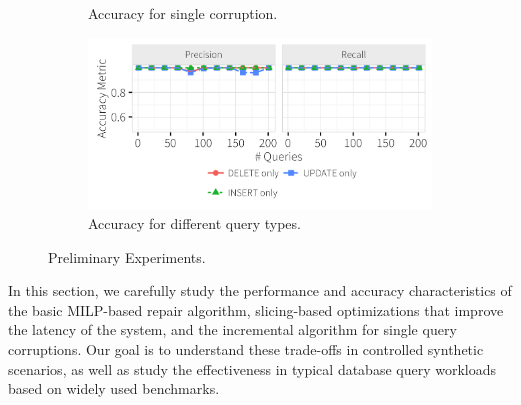 \begin{figure}[h]
\begin{subfigure}[t]{.3\textwidth}
    \vspace*{-.25in}
    \caption{Accuracy for single corruption.}
    \label{f:singlequeryinc_acc} 
    \end{subfigure}
    \begin{subfigure}[t]{.3\textwidth}
    \includegraphics[width = .99\columnwidth]{figures/indelup_pr}
    \vspace*{-.25in}
    \caption{Accuracy for different query types.}
    \label{f:indelup_acc} 
    \end{subfigure}
    \vspace*{-.1in}
    \caption{Preliminary Experiments.}
  \end{figure}


In this section, we carefully study the performance and accuracy
characteristics of the basic MILP-based repair algorithm, 
slicing-based optimizations that improve the latency of the system, 
and the incremental algorithm for single query corruptions. 
Our goal is to understand these trade-offs in
controlled synthetic scenarios, as well as study the effectiveness
in typical database query workloads based on widely used benchmarks.


